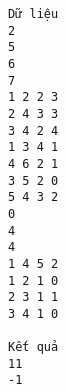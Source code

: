 \begin{verbatim}
Dữ liệu
2
5
6
7
1 2 2 3
2 4 3 3
3 4 2 4
1 3 4 1
4 6 2 1
3 5 2 0
5 4 3 2
0
4
4
1 4 5 2
1 2 1 0
2 3 1 1
3 4 1 0

Kết quả
11
-1
\end{verbatim}